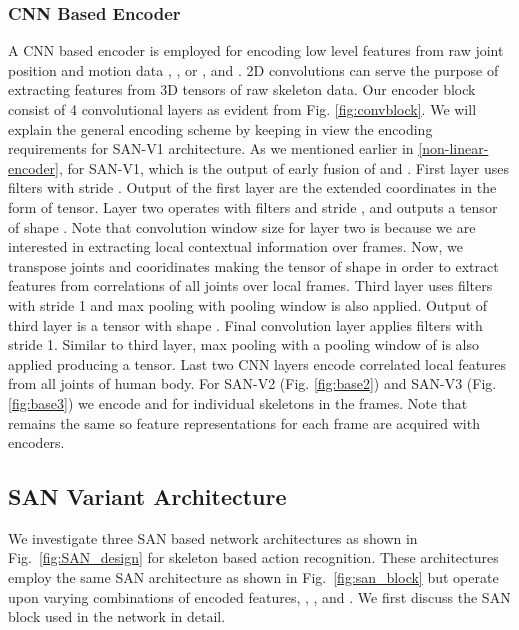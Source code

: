 \documentclass[10pt,twocolumn,letterpaper]{article}
\begin{document}
\subsubsection{CNN Based Encoder}
\label{CNN_block}
A CNN based encoder is employed for encoding low level features from raw joint position and motion data , , or , and . 
2D convolutions can serve the purpose of extracting features from 3D tensors of raw skeleton data. Our encoder block consist of 4 convolutional layers as evident from Fig. \ref{fig:convblock}. 
We will explain the general encoding scheme by keeping in view the encoding requirements for SAN-V1 architecture. As we mentioned earlier in \ref{non-linear-encoder}, for SAN-V1,  which is the output of early fusion of  and .
 First layer uses  filters with stride . Output of the first layer are the extended coordinates in the form of  tensor. Layer two operates with  filters and stride , and outputs a tensor of shape . Note that convolution window size for layer two is  because we are interested in extracting local contextual information over frames. Now, we transpose joints and cooridinates making the tensor of shape  in order to extract features from correlations of all joints over local frames.
 Third layer uses  filters with stride 1 and max pooling with  pooling window is also applied. Output of third layer is a tensor with shape . Final convolution layer applies  filters with stride 1. Similar to third layer, max pooling with a pooling window of  is also applied producing a  tensor. Last two CNN layers encode correlated local features from all joints of human body. For SAN-V2 (Fig. \ref{fig:base2}) and SAN-V3 (Fig. \ref{fig:base3}) we encode  and  for individual skeletons in the frames. Note that  remains the same so feature representations for each frame are acquired with encoders.

\subsection{SAN Variant Architecture}
\label{sec:SAN-base}
We investigate three SAN based network architectures as shown in Fig.~\ref{fig:SAN_design} for skeleton based action recognition. These architectures employ the same SAN architecture as shown in Fig.~\ref{fig:san_block} but operate upon varying combinations of encoded features, , , and . 
We first discuss the SAN block used in the network in detail.
\end{document}
